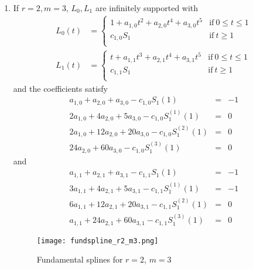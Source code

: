 \begin{enumerate}
  \item If $r=2, m=3$, $L_0, L_1$ are infinitely supported with
    \begin{align*}
      L_0(t) &= 
     \begin{cases}
        1 + a_{1,0} t^2 + a_{2,0}t^4 + a_{3,0}t^5 & \text{if} \ 0 \leq t \leq 1 \\
	c_{1,0} S_1 & \text{if} \  t \geq 1 \\
      \end{cases} \\
     L_1(t) &= 
     \begin{cases}
        t + a_{1,1} t^3 + a_{2,1}t^4 + a_{3,1}t^5 & \text{if} \ 0 \leq t \leq 1 \\
	c_{1,1} S_1 & \text{if} \  t \geq 1 \\
      \end{cases}
    \end{align*}
    and the coefficients satisfy
    \begin{equation*}
      \begin{array}{rcl}
       a_{1,0} + a_{2,0} + a_{3,0} - c_{1,0} S_1(1) & = & -1  \\
       2a_{1,0} + 4a_{2,0} + 5a_{3,0} - c_{1,0} S_1^{(1)}(1) & = & 0 \\
       2a_{1,0} + 12a_{2,0} + 20a_{3,0} - c_{1,0} S_1^{(2)}(1) & = & 0 \\
       24a_{2,0} + 60a_{3,0} - c_{1,0} S_1^{(3)}(1) & = & 0 
      \end{array}
    \end{equation*}
    and 
    \begin{equation*}
      \begin{array}{rcl}
       a_{1,1} + a_{2,1} + a_{3,1} - c_{1,1} S_1(1) & = & -1  \\
       3a_{1,1} + 4a_{2,1} + 5a_{3,1} - c_{1,1} S_1^{(1)}(1) & = & -1 \\
       6a_{1,1} + 12a_{2,1} + 20a_{3,1} - c_{1,1} S_1^{(2)}(1) & = & 0 \\
       a_{1,1} + 24a_{2,1} + 60a_{3,1} - c_{1,1} S_1^{(3)}(1) & = & 0 
      \end{array}
    \end{equation*}
    \begin{figure}[!h]
      \centering
      \texttt{[image: fundspline\_r2\_m3.png]}
      \caption{Fundamental splines for $r=2$, $m=3$}
    \end{figure}
\end{enumerate}


